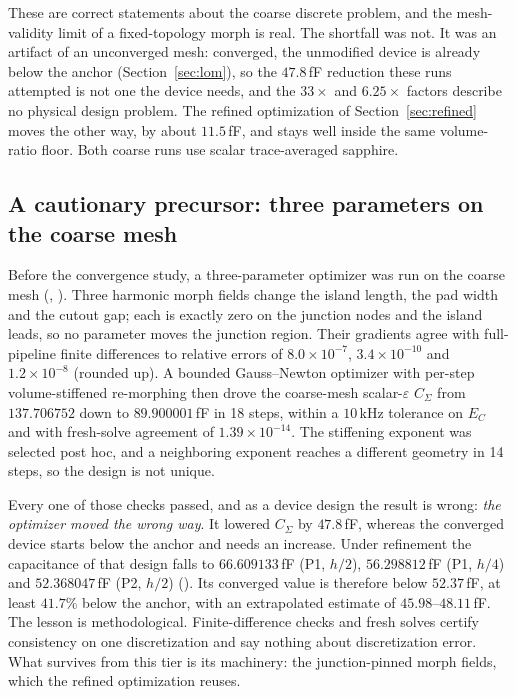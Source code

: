 \documentclass{anvil-paper}
\begin{document}
These are correct statements about the coarse discrete problem, and the
mesh-validity limit of a fixed-topology morph is real. The shortfall
was not. It was an artifact of an unconverged mesh: converged, the
unmodified device is already below the anchor (Section~\ref{sec:lom}),
so the $47.8$\,fF reduction these runs attempted is not one the device
needs, and the $33\times$ and $6.25\times$ factors describe no physical
design problem. The refined optimization of Section~\ref{sec:refined}
moves the other way, by about $11.5$\,fF, and stays well inside the
same volume-ratio floor. Both coarse runs use scalar trace-averaged
sapphire.

\subsection{A cautionary precursor: three parameters on the coarse mesh}
\label{sec:multiparam}

Before the convergence study, a three-parameter optimizer was run on
the coarse mesh
(,
). Three
harmonic morph fields change the island length, the pad width and the
cutout gap; each is exactly zero on the junction nodes and the island
leads, so no parameter moves the junction region. Their gradients agree
with full-pipeline finite differences to relative errors of
$8.0\times10^{-7}$, $3.4\times10^{-10}$ and $1.2\times10^{-8}$ (rounded up). A
bounded Gauss--Newton optimizer with per-step volume-stiffened
re-morphing then drove the coarse-mesh scalar-$\varepsilon$ $C_\Sigma$
from $137.706752$ down to $89.900001$\,fF in 18 steps, within a
$10$\,kHz tolerance on $E_C$ and with fresh-solve agreement of
$1.39\times10^{-14}$. The stiffening exponent was selected post hoc,
and a neighboring exponent reaches a different geometry in 14 steps, so
the design is not unique.

Every one of those checks passed, and as a device design the result is
wrong: \emph{the optimizer moved the wrong way}. It lowered $C_\Sigma$
by $47.8$\,fF, whereas the converged device starts below the anchor and
needs an increase. Under refinement the capacitance of that design
falls to $66.609133$\,fF (P1, $h/2$), $56.298812$\,fF (P1, $h/4$) and
$52.368047$\,fF (P2, $h/2$)
(). Its
converged value is therefore below $52.37$\,fF, at least $41.7\%$ below
the anchor, with an extrapolated estimate of $45.98$--$48.11$\,fF. The
lesson is methodological. Finite-difference checks and fresh solves
certify consistency on one discretization and say nothing about
discretization error. What survives from this tier is its machinery:
the junction-pinned morph fields, which the refined optimization
reuses.
\end{document}

